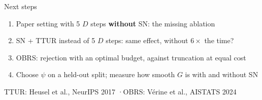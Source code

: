 \documentclass[aspectratio=169,10pt]{beamer}
\newcommand{\refs}[1]{{\color{grey}\scriptsize #1}}
\begin{document}
\begin{frame}{Next steps}
\begin{enumerate}\setlength\itemsep{1.0em}
\item Paper setting with 5 $D$ steps \textbf{without} SN: the missing ablation
\item SN + TTUR instead of 5 $D$ steps: same effect, without $6\times$ the time?
\item OBRS: rejection with an optimal budget, against truncation at equal cost
\item Choose $\psi$ on a held-out split; measure how smooth $G$ is with and without SN
\end{enumerate}

\vfill
\refs{TTUR: Heusel et al., NeurIPS 2017 \quad·\quad OBRS: Vérine et al., AISTATS 2024}
\vspace{0.4em}
\end{frame}
\end{document}
